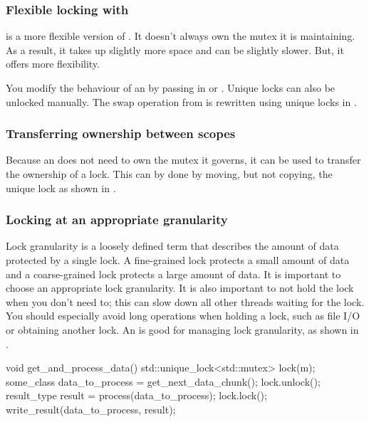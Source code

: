 \subsubsection{Flexible locking with }
 is a more flexible version of . It doesn't always own the mutex it is maintaining. As a result, it takes up slightly more space and can be slightly slower. But, it offers more flexibility.

You modify the behaviour of an  by passing in  or . Unique locks can also be unlocked manually. The swap operation from  is rewritten using unique locks in .


\subsubsection{Transferring ownership between scopes}
Because an  does not need to own the mutex it governs, it can be used to transfer the ownership of a lock. This can by done by moving, but not copying, the unique lock as shown in .


\subsubsection{Locking at an appropriate granularity}
Lock granularity is a loosely defined term that describes the amount of data protected by a single lock. A fine-grained lock protects a small amount of data and a coarse-grained lock protects a large amount of data.  It is important to choose an appropriate lock granularity. It is also important to not hold the lock when you don't need to; this can slow down all other threads waiting for the lock. You should especially avoid long operations when holding a lock, such as file I/O or obtaining another lock. An  is good for managing lock granularity, as shown in .

\begin{CPP}[label=list:unique-lock-granularity,caption=Obtaining appropriate lock granularity using \cpp{std::unique_lock}]
void get_and_process_data() {
    std::unique_lock<std::mutex> lock(m);
    some_class data_to_process = get_next_data_chunk();
    lock.unlock();
    result_type result = process(data_to_process);
    lock.lock();
    write_result(data_to_process, result);
}
\end{CPP}

